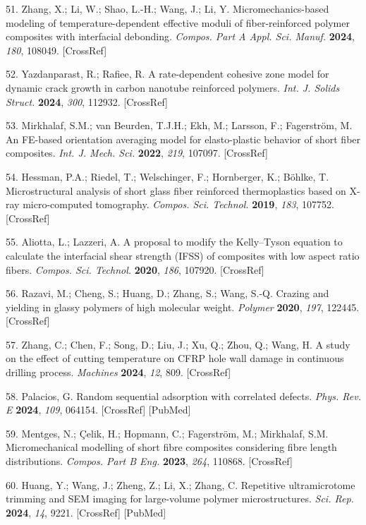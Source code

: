 \documentclass{article}
\begin{document}
\begin{hangpars}
51. Zhang, X.; Li, W.; Shao, L.-H.; Wang, J.; Li, Y. Micromechanics-based modeling of temperature-dependent effective moduli of fiber-reinforced polymer composites with interfacial debonding. \emph{Compos. Part A Appl. Sci. Manuf.} \textbf{2024}, \emph{180}, 108049. [CrossRef]

52. Yazdanparast, R.; Rafiee, R. A rate-dependent cohesive zone model for dynamic crack growth in carbon nanotube reinforced polymers. \emph{Int. J. Solids Struct.} \textbf{2024}, \emph{300}, 112932. [CrossRef]

53. Mirkhalaf, S.M.; van Beurden, T.J.H.; Ekh, M.; Larsson, F.; Fagerström, M. An FE-based orientation averaging model for elasto-plastic behavior of short fiber composites. \emph{Int. J. Mech. Sci.} \textbf{2022}, \emph{219}, 107097. [CrossRef]

54. Hessman, P.A.; Riedel, T.; Welschinger, F.; Hornberger, K.; Böhlke, T. Microstructural analysis of short glass fiber reinforced thermoplastics based on X-ray micro-computed tomography. \emph{Compos. Sci. Technol.} \textbf{2019}, \emph{183}, 107752. [CrossRef]

55. Aliotta, L.; Lazzeri, A. A proposal to modify the Kelly–Tyson equation to calculate the interfacial shear strength (IFSS) of composites with low aspect ratio fibers. \emph{Compos. Sci. Technol.} \textbf{2020}, \emph{186}, 107920. [CrossRef]

56. Razavi, M.; Cheng, S.; Huang, D.; Zhang, S.; Wang, S.-Q. Crazing and yielding in glassy polymers of high molecular weight. \emph{Polymer} \textbf{2020}, \emph{197}, 122445. [CrossRef]

57. Zhang, C.; Chen, F.; Song, D.; Liu, J.; Xu, Q.; Zhou, Q.; Wang, H. A study on the effect of cutting temperature on CFRP hole wall damage in continuous drilling process. \emph{Machines} \textbf{2024}, \emph{12}, 809. [CrossRef]

58. Palacios, G. Random sequential adsorption with correlated defects. \emph{Phys. Rev. E} \textbf{2024}, \emph{109}, 064154. [CrossRef] [PubMed]

59. Mentges, N.; Çelik, H.; Hopmann, C.; Fagerström, M.; Mirkhalaf, S.M. Micromechanical modelling of short fibre composites considering fibre length distributions. \emph{Compos. Part B Eng.} \textbf{2023}, \emph{264}, 110868. [CrossRef]

60. Huang, Y.; Wang, J.; Zheng, Z.; Li, X.; Zhang, C. Repetitive ultramicrotome trimming and SEM imaging for large-volume polymer microstructures. \emph{Sci. Rep.} \textbf{2024}, \emph{14}, 9221. [CrossRef] [PubMed]


\end{hangpars}
\end{document}
